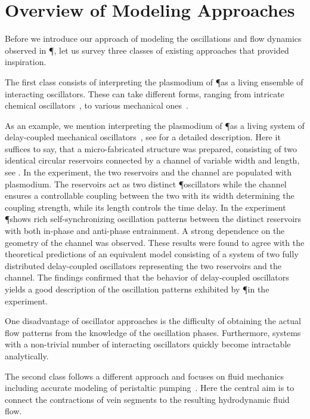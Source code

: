 
\section{Overview of Modeling Approaches}\label{sec:model}

  Before we introduce our approach of modeling the oscillations and flow dynamics observed in \P, let us survey three classes of existing approaches that provided inspiration. 

  The first class consists of interpreting the plasmodium of \P as a living ensemble of interacting oscillators. These can take different forms, ranging from intricate chemical oscillators~\cite{Smith1992368}, to various mechanical ones~\cite{PhysRevLett.85.2026,tero2005coupled,takamatsu2001spatiotemporal}. 

  As an example, we mention interpreting the plasmodium of \P as a living system of delay-coupled mechanical oscillators~\cite{PhysRevLett.85.2026}, see  for a detailed description. Here it suffices to say, that a micro-fabricated structure was prepared, consisting of two identical circular reservoirs connected by a channel of variable width and length, see . In the experiment, the two reservoirs and the channel are populated with plasmodium. The reservoirs act as two distinct \P oscillators while the channel ensures a controllable coupling between the two with its width determining the coupling strength, while its length controls the time delay. In the experiment \P shows rich self-synchronizing oscillation patterns between the distinct reservoirs with both in-phase and anti-phase entrainment. A strong dependence on the geometry of the channel was observed. These results were found to agree with the theoretical predictions of an equivalent model consisting of a system of two fully distributed delay-coupled oscillators representing the two reservoirs and the channel. The findings confirmed that the behavior of delay-coupled oscillators yields a good description of the oscillation patterns exhibited by \P in the experiment.

  One disadvantage of oscillator approaches is the difficulty of obtaining the actual flow patterns from the knowledge of the oscillation phases. Furthermore, systems with a non-trivial number of interacting oscillators quickly become intractable analytically.

  The second class follows a different approach and focuses on fluid mechanics including accurate modeling of peristaltic pumping~\cite{alim2013random,teplov1991continuum}. Here the central aim is to connect the contractions of vein segments to the resulting hydrodynamic fluid flow.


